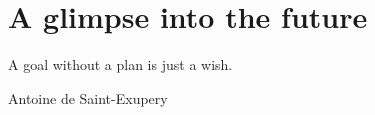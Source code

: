 \documentclass[10pt, oneside]{book}
\theoremstyle{definition} \newtheorem{definition}{Definición}[section]
\theoremstyle{plain} \newtheorem{theorem}{Teorema}[section]
\theoremstyle{plain} \newtheorem{lemma}{Lema}[section]
\theoremstyle{plain} \newtheorem{proposition}[theorem]{Proposici\'on}
\theoremstyle{plain} \newtheorem{corollary}[theorem]{Corolario}
\theoremstyle{plain} \newtheorem{remark}[theorem]{Comentario}
\begin{document}
\chapter{A glimpse into the future}
\epigraph{A goal without a plan is just a wish.}{Antoine de Saint-Exupery}


\iffalse

\backmatter
\appendix
\chapter{Appendix A}

\chapter{Appendix B}

\chapter{Appendix C}


\fi

\cleardoublepage
{}


\cleardoublepage
\printindex
\end{document}
